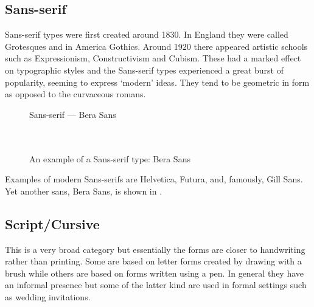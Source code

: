 \documentclass[10pt,a4paper,oneside,extrafontsizes]{memoir}%
\begin{document}
\subsection{Sans-serif}

\begin{paracol}{2}
\switchEng
    Sans-serif types were first created around 1830. In England they were
called Grotesques and in America Gothics. 
Around 1920 there appeared artistic
schools such as Expressionism, Constructivism and Cubism. These had a
marked effect on typographic styles and the Sans-serif types experienced
a great burst of popularity, seeming to express `modern' ideas. They tend to
be geometric in form as opposed to the curvaceous romans.
\end{paracol}

\begin{figure}
\centering
{\centering{}\selectfont
  Sans-serif --- Bera Sans \\
  \UCalphabet \\
  \LCalphabet \\
  \fox\par}
\caption{An example of a Sans-serif type: Bera Sans} 
   \label{fig:berasans}
\end{figure}

\begin{paracol}{2}
\switchEng
    Examples of modern Sans-serifs are 
Helvetica, 
Futura,
and, famously, Gill Sans. 
Yet another sans, 
Bera Sans\facesubseeidx{Bera Sans}, is shown in .
\end{paracol}

\subsection{Script/Cursive}

\begin{paracol}{2}
\switchEng
    This is a very broad category but 
essentially the forms are closer
to handwriting rather than printing. Some are based on letter forms created
by drawing with a brush while others are based on forms written using
a pen. In general they have an informal
presence but some of the latter kind are used in formal settings such 
as wedding invitations.
\end{paracol}
\end{document}
